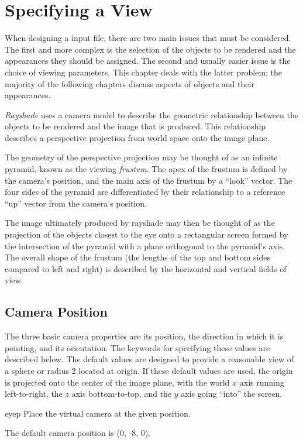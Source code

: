 \chapter{Specifying a View}

When designing a \rayshade input file, there are two main
issues that must be considered.  The first and more complex
is the selection of the objects to be rendered and the appearances
they should be assigned.  The second and usually easier issue is
the choice of viewing parameters.  This chapter deals with the
latter problem; the majority of the following chapters
discuss aspects of objects and their appearances.

{\em Rayshade} uses a camera model to describe
the geometric relationship between the objects to be rendered
and the image that is produced.  This relationship describes
a perspective projection from world space onto the image plane.

The geometry of the perspective projection
may be thought of as an
infinite pyramid, known as the viewing {\em frustum}.
The apex of the frustum is defined by the camera's position,
and the main axis of the frustum by a ``look'' vector.
The four sides of
the pyramid are differentiated by their relationship to a
reference ``up'' vector from the camera's position.

The image
ultimately produced by rayshade may then be thought of as
the projection of the objects closest to the eye onto
a rectangular screen formed by the intersection of the pyramid with
a plane orthogonal to the pyramid's axis.  The overall shape
of the frustum (the lengths of the top and bottom sides compared
to left and right)
is described by the horizontal and vertical fields
of view.

\section{Camera Position}

The three basic camera properties are its position, the direction
in which it is pointing, and its orientation.  The keywords for
specifying these values are described below.
The default values
are designed to provide a reasonable view of a sphere or radius 2
located at origin.  If these default values are used,
the origin is projected onto the center of the image plane, with
the world $x$ axis  running left-to-right, the $z$ axis bottom-to-top,
and the $y$ axis going ``into'' the screen.

\begin{defkey}{eyep}{}
	Place the virtual camera at the given position.
\end{defkey}
The default camera position is (0, -8, 0).

